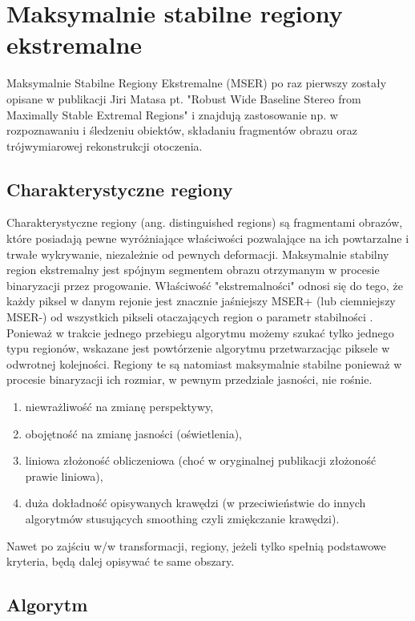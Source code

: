 \chapter{Maksymalnie stabilne regiony ekstremalne}

Maksymalnie Stabilne Regiony Ekstremalne (MSER) po raz pierwszy zostały opisane
w publikacji Jiri Matasa pt. "Robust Wide Baseline Stereo from Maximally Stable
Extremal Regions" i znajdują zastosowanie np. w rozpoznawaniu i śledzeniu
obiektów, składaniu fragmentów obrazu oraz trójwymiarowej rekonstrukcji
otoczenia.

\section{Charakterystyczne regiony}

Charakterystyczne regiony (ang. distinguished regions) są fragmentami obrazów,
które posiadają pewne wyróżniające właściwości pozwalające na ich powtarzalne i
trwałe wykrywanie, niezależnie od pewnych deformacji. Maksymalnie stabilny
region ekstremalny jest spójnym segmentem obrazu otrzymanym w procesie
binaryzacji przez progowanie. Właściwość "ekstremalności" odnosi się do tego,
że każdy piksel w danym rejonie jest znacznie jaśniejszy MSER+ (lub ciemniejszy
MSER-) od wszystkich pikseli otaczających region o parametr stabilności
. Ponieważ w trakcie jednego przebiegu algorytmu możemy szukać
tylko jednego typu regionów, wskazane jest powtórzenie algorytmu przetwarzacjąc 
piksele w odwrotnej kolejności. Regiony te są natomiast maksymalnie stabilne
ponieważ w procesie binaryzacji ich rozmiar, w pewnym przedziale jasności, nie
rośnie.

\begin{enumerate} MSER-y posiadają szereg pożadanych cech, w tym:
\item niewrażliwość na zmianę perspektywy, \item obojętność na zmianę
jasności (oświetlenia), \item liniowa złożoność obliczeniowa (choć w
oryginalnej publikacji złożoność prawie liniowa), \item duża dokładność
opisywanych krawędzi (w przeciwieństwie do innych algorytmów
stusujących smoothing czyli zmiękczanie krawędzi).  \end{enumerate}

Nawet po zajściu w/w transformacji, regiony, jeżeli tylko
spełnią podstawowe kryteria, będą dalej opisywać te same obszary.

\section{Algorytm}

